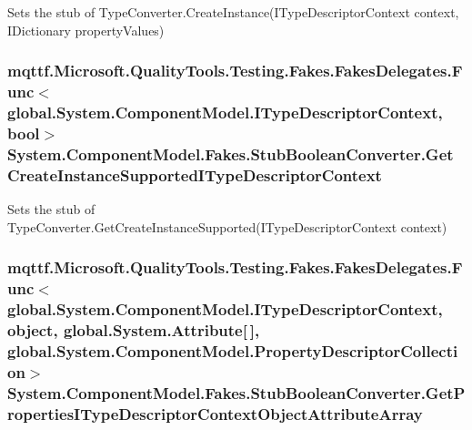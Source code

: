Sets the stub of Type\-Converter.\-Create\-Instance(\-I\-Type\-Descriptor\-Context context, I\-Dictionary property\-Values)

\hypertarget{class_system_1_1_component_model_1_1_fakes_1_1_stub_boolean_converter_ac145b3f8db7a3e4cbb5da59d4651324a}{
\subsubsection[{Get\-Create\-Instance\-Supported\-I\-Type\-Descriptor\-Context}]{\setlength{\rightskip}{0pt plus 5cm}mqttf.\-Microsoft.\-Quality\-Tools.\-Testing.\-Fakes.\-Fakes\-Delegates.\-Func$<$global.\-System.\-Component\-Model.\-I\-Type\-Descriptor\-Context, bool$>$ System.\-Component\-Model.\-Fakes.\-Stub\-Boolean\-Converter.\-Get\-Create\-Instance\-Supported\-I\-Type\-Descriptor\-Context}}\label{class_system_1_1_component_model_1_1_fakes_1_1_stub_boolean_converter_ac145b3f8db7a3e4cbb5da59d4651324a}


Sets the stub of Type\-Converter.\-Get\-Create\-Instance\-Supported(\-I\-Type\-Descriptor\-Context context)

\hypertarget{class_system_1_1_component_model_1_1_fakes_1_1_stub_boolean_converter_a7e7ca18bced48f10c719c4c96994b34d}{
\subsubsection[{Get\-Properties\-I\-Type\-Descriptor\-Context\-Object\-Attribute\-Array}]{\setlength{\rightskip}{0pt plus 5cm}mqttf.\-Microsoft.\-Quality\-Tools.\-Testing.\-Fakes.\-Fakes\-Delegates.\-Func$<$global.\-System.\-Component\-Model.\-I\-Type\-Descriptor\-Context, object, global.\-System.\-Attribute\mbox{[}$\,$\mbox{]}, global.\-System.\-Component\-Model.\-Property\-Descriptor\-Collection$>$ System.\-Component\-Model.\-Fakes.\-Stub\-Boolean\-Converter.\-Get\-Properties\-I\-Type\-Descriptor\-Context\-Object\-Attribute\-Array}}\label{class_system_1_1_component_model_1_1_fakes_1_1_stub_boolean_converter_a7e7ca18bced48f10c719c4c96994b34d}


